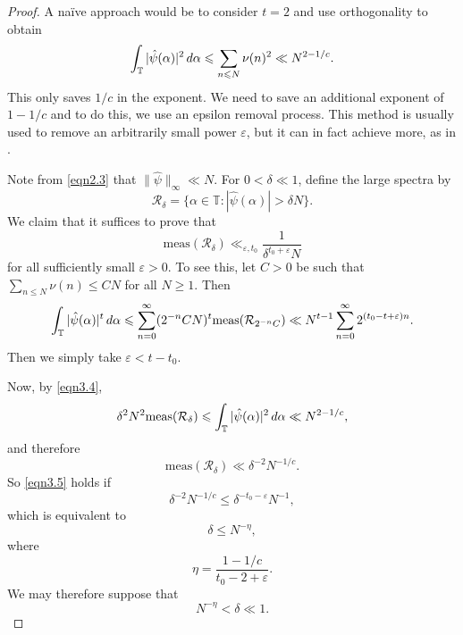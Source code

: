 \documentclass[12pt, reqno]{amsart}
\theoremstyle{definition}
\theoremstyle{remark}
\numberwithin{equation}{section}
\theoremstyle{definition}
\def\alp{{\alpha}} \def\bfalp{{\boldsymbol \alpha}}
\def\del{{\delta}} \def\Del{{\Delta}}
\def\eps{\varepsilon}
\def\le{\leqslant} \def\ge{\geqslant} \def\pleq{\preccurlyeq} \def\ple{\prec}
\def\d{{\,{\rm d}}}
\def \bT {\mathbb T}
\begin{document}
\begin{proof}
A na\"ive approach would be to consider $t=2$ and use orthogonality to obtain
\begin{equation}\label{eqn3.4}
\int_{\bT} |\hat{\psi}(\alp)|^{2}\d \alp \le \sum_{n \le N} \nu(n)^{2} \ll N^{2-1/c}.
\end{equation}
This only saves $1/c$ in the exponent. We need to save an additional exponent of $1-1/c$ and to do this, we use an epsilon removal process. This method is usually used to remove an arbitrarily small power $\eps$, but it can in fact achieve more, as in \cite[Appendix E]{CLP2021}.

Note from \eqref{eqn2.3} that $\| \hat \psi \|_\infty \ll N$.
For $0 < \del \ll 1$, define the large spectra by
\[
\mathcal{R}_{\delta} = \{ \alp \in \bT : |\hat{\psi}(\alp)| > \delta N \}.
\]
We claim that it suffices to prove that
\begin{equation}
\label{eqn3.5}
\mathrm{meas}
(\mathcal{R}_{\delta}) \ll_{\eps,t_0} \frac{1}{\delta^{t_{0}+\eps}N}
\end{equation}
for all sufficiently small $\eps>0$. To see this, let $C>0$ be such that $\sum_{n \le N} \nu(n) \le CN$ for all $N \ge 1$. Then
\[
\int_{\bT} |\hat{\psi}(\alp)|^{t} \d \alp \le \sum_{n=0}^{\infty} (2^{-n} CN)^{t} \mathrm{meas}(\mathcal{R}_{2^{-n}C}) \ll N^{t-1} \sum_{n=0}^{\infty} 2^{(t_{0}-t+\eps)n}.
\]
Then we simply take $\eps < t-t_{0}$.

Now, by \eqref{eqn3.4},
\[
\delta^{2}N^{2} \mathrm{meas}(\mathcal{R}_{\delta}) \le \int_{\bT} |\hat{\psi}(\alp)|^{2} \d \alp \ll N^{2-1/c},
\]
and therefore
\[
\mathrm{meas}(\mathcal{R}_{\delta}) \ll \delta^{-2}N^{-1/c}.
\]
So \eqref{eqn3.5} holds if
\[ \delta^{-2}N^{-1/c} \le \delta^{-t_{0}-\eps}N^{-1},
\]
which is equivalent to
\[
\delta \le N^{-\eta},
\]
where
\begin{equation}
\label{eqn3.6}
\eta = \frac{1-1/c}{t_{0}-2+\eps}.
\end{equation}
We may therefore suppose that
\begin{equation}
\label{eqn3.7}
N^{-\eta} < \delta \ll 1.
\end{equation}


\end{proof}
\end{document}
